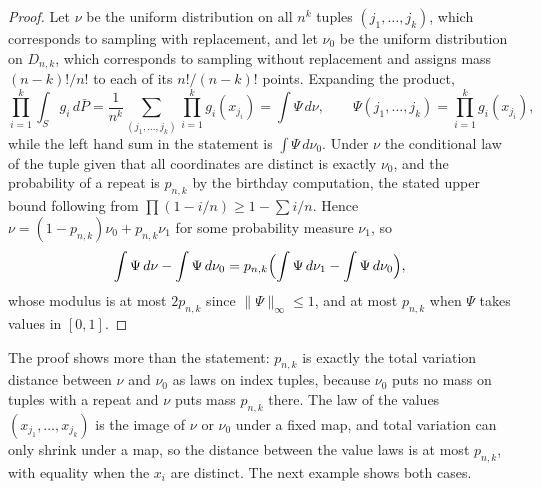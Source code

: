 \begin{proof}
Let $\nu$ be the uniform distribution on all $n^k$ tuples $(j_1,\dots,j_k)$, which
corresponds to sampling with replacement, and let $\nu_0$ be the uniform distribution
on $D_{n,k}$, which corresponds to sampling without replacement and assigns mass
$(n-k)!/n!$ to each of its $n!/(n-k)!$ points. Expanding the product,
\[
\prod_{i=1}^{k} \int_S g_i \, d\bar{P}
= \frac{1}{n^k} \sum_{(j_1,\dots,j_k)} \prod_{i=1}^{k} g_i(x_{j_i})
= \int \Psi \, d\nu, \qquad
\Psi(j_1,\dots,j_k) = \prod_{i=1}^{k} g_i(x_{j_i}),
\]
while the left hand sum in the statement is $\int \Psi \, d\nu_0$. Under $\nu$ the
conditional law of the tuple given that all coordinates are distinct is exactly
$\nu_0$, and the probability of a repeat is $p_{n,k}$ by the birthday computation, the
stated upper bound following from $\prod (1 - i/n) \ge 1 - \sum i /n$. Hence
$\nu = (1 - p_{n,k}) \nu_0 + p_{n,k} \nu_1$ for some probability measure $\nu_1$, so
\[
\int \Psi \, d\nu - \int \Psi \, d\nu_0
= p_{n,k} \Bigl( \int \Psi \, d\nu_1 - \int \Psi \, d\nu_0 \Bigr),
\]
whose modulus is at most $2 p_{n,k}$ since $\|\Psi\|_\infty \le 1$, and at most
$p_{n,k}$ when $\Psi$ takes values in $[0,1]$.
\end{proof}

The proof shows more than the statement: $p_{n,k}$ is exactly the total variation
distance between $\nu$ and $\nu_0$ as laws on index tuples, because $\nu_0$ puts no
mass on tuples with a repeat and $\nu$ puts mass $p_{n,k}$ there. The law of the
values $(x_{j_1},\dots,x_{j_k})$ is the image of $\nu$ or $\nu_0$ under a fixed map, and
total variation can only shrink under a map, so the distance between the value laws is
at most $p_{n,k}$, with equality when the $x_i$ are distinct. The next example shows
both cases.

